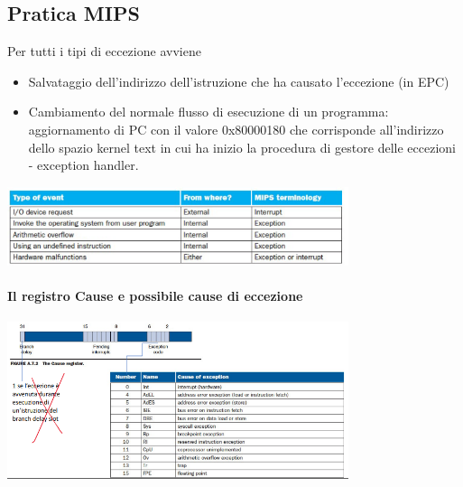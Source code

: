 \documentclass[12pt, a4paper, openany]{book}
\begin{document}
\subsection*{Pratica MIPS}
Per tutti i tipi di eccezione avviene
\begin{itemize}
    \item Salvataggio dell'indirizzo dell'istruzione che ha causato l'eccezione (in EPC)
    \item Cambiamento del normale flusso di esecuzione di un programma: aggiornamento di PC
    con il valore 0x80000180 che corrisponde all'indirizzo dello spazio kernel text in cui
    ha inizio la procedura di gestore delle eccezioni - exception handler.
\end{itemize}
\begin{center}
    \includegraphics[width=100mm, scale=0.5]{Eccezioni e interruzioni.png}
\end{center}
\paragraph*{Il registro Cause e possibile cause di eccezione}
\begin{center}
    \includegraphics[width=100mm, scale=0.5]{Possibili cause di eccezione.png}
\end{center}
\end{document}
